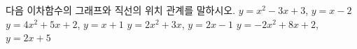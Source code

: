 다음 이차함수의 그래프와 직선의 위치 관계를 말하시오.
 $y=x^2-3x+3$, $y=x-2$
 $y=4x^2+5x+2$, $y=x+1$
 $y=2x^2+3x$, $y=2x-1$
 $y=-2x^2+8x+2$, $y=2x+5$
